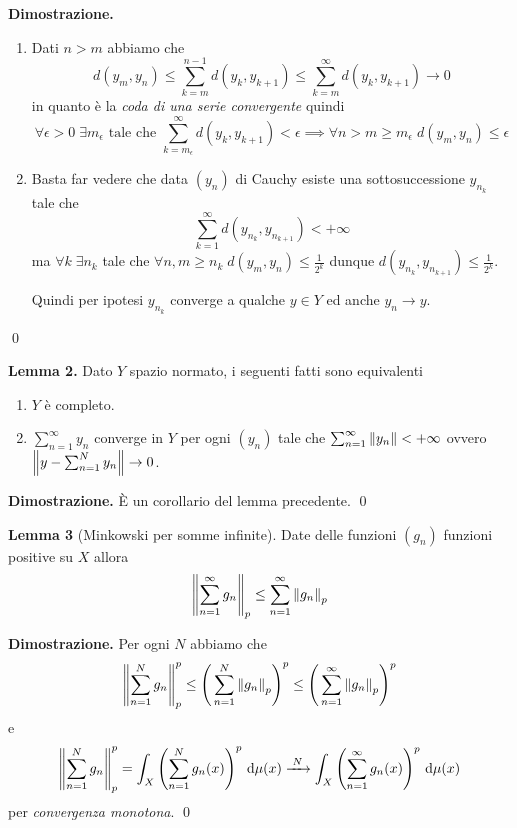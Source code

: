 \documentclass[a4paper, 12pt]{report}
\begin{document}
\textbf{Dimostrazione.}
\begin{enumerate}
	\item 
		Dati $n > m$ abbiamo che 
		$$
		d(y_m, y_n) \leq \sum_{k=m}^{n-1} d(y_k, y_{k+1}) \leq \sum_{k=m}^\infty d(y_k, y_{k+1}) \to 0
		$$
		in quanto è la \textit{coda di una serie convergente} quindi 
		$$
		\forall \epsilon > 0 \; \exists m_\epsilon \text{ tale che } \sum_{k = m_\epsilon}^\infty d(y_k, y_{k+1})< \epsilon \implies \forall n > m \geq m_\epsilon \; d(y_m, y_n) \leq \epsilon
		$$ 

	\item
		Basta far vedere che data $(y_n)$ di Cauchy esiste una sottosuccessione $y_{n_k}$ tale che
		$$
		\sum_{k=1}^\infty d(y_{n_k}, y_{n_{k+1}}) < +\infty
		$$
		ma $\forall k \; \exists n_k$ tale che $\forall n, m \geq n_k \; d(y_m, y_n) \leq \frac{1}{2^k}$ dunque $d(y_{n_k}, y_{n_{k+1}}) \leq \frac{1}{2^k}$.

		Quindi per ipotesi $y_{n_k}$ converge a qualche $y \in Y$ ed anche $y_n \to y$.
\end{enumerate}
\qed

\newpage

\hypertarget{prop:completeness_lemma_2}{}
\textbf{Lemma 2.} 
Dato $Y$ spazio normato, i seguenti fatti sono equivalenti
\begin{enumerate}
	\item $Y$ è completo.

	\item $\sum_{n=1}^\infty y_n$ converge in $Y$ per ogni $(y_n)$ tale che $\sum_{n=1}^\infty \left\lVert y_n \right\rVert < +\infty$ ovvero $\left\lVert y - \sum_{n=1}^N y_n \right\rVert \to 0$.
\end{enumerate}

\textbf{Dimostrazione.} 
È un corollario del lemma precedente. 
\qed

\hypertarget{prop:completeness_lemma_3}{}
\textbf{Lemma 3} 
(Minkowski per somme infinite). 
Date delle funzioni $(g_n)$ funzioni positive su $X$ allora
$$
\left\lVert \sum_{n=1}^\infty g_n \right\rVert_p \leq \sum_{n=1}^\infty \left\lVert g_n \right\rVert_p
$$

\textbf{Dimostrazione.}
Per ogni $N$ abbiamo che
$$
\left\lVert \sum_{n=1}^N g_n \right\rVert_p^p 
\leq \left( \,\sum_{n=1}^N \left\lVert g_n \right\rVert_p \right)^p 
\leq \left( \,\sum_{n=1}^\infty \left\lVert g_n \right\rVert_p \right)^p 
$$
e
$$
\left\lVert \sum_{n=1}^N g_n \right\rVert_p^p 
= \int_X \left( \sum_{n=1}^N g_n(x) \right)^p \,\mathrm{d} \mu(x)
\xrightarrow{\;N\;} \int_X \left( \sum_{n=1}^\infty g_n(x) \right)^p \,\mathrm{d} \mu(x)
$$
per \textit{convergenza monotona}.
\qed
\end{document}
